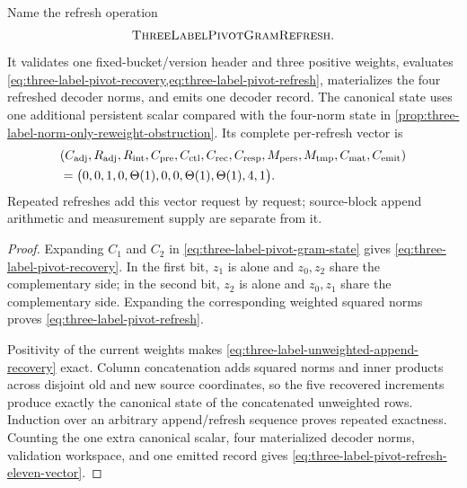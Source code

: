 \begin{theorem}
Name the refresh operation
\begin{equation*}
 \textsc{ThreeLabelPivotGramRefresh}.
\end{equation*}
It validates one fixed-bucket/version header and three positive weights, evaluates
\cref{eq:three-label-pivot-recovery,eq:three-label-pivot-refresh}, materializes
the four refreshed decoder norms, and emits one decoder record.  The canonical
state uses one additional persistent scalar compared with the four-norm state
in \cref{prop:three-label-norm-only-reweight-obstruction}.  Its complete
per-refresh vector is
\begin{equation}
 \begin{aligned}
 &(C_{\rm adj},R_{\rm adj},R_{\rm int},C_{\rm pre},C_{\rm ctl},C_{\rm rec},
 C_{\rm resp},M_{\rm pers},M_{\rm tmp},C_{\rm mat},C_{\rm emit})\\
 &=\bigl(0,0,1,0,\Theta(1),0,0,\Theta(1),\Theta(1),4,1\bigr).
 \end{aligned}
 \label{eq:three-label-pivot-refresh-eleven-vector}
\end{equation}
Repeated refreshes add this vector request by request; source-block append
arithmetic and measurement supply are separate from it.
\end{theorem}

\begin{proof}
Expanding $C_1$ and $C_2$ in
\cref{eq:three-label-pivot-gram-state} gives
\cref{eq:three-label-pivot-recovery}.  In the first bit, $z_1$ is alone and
$z_0,z_2$ share the complementary side; in the second bit, $z_2$ is alone and
$z_0,z_1$ share the complementary side.  Expanding the corresponding weighted
squared norms proves \cref{eq:three-label-pivot-refresh}.

Positivity of the current weights makes
\cref{eq:three-label-unweighted-append-recovery} exact.  Column concatenation
adds squared norms and inner products across disjoint old and new source
coordinates, so the five recovered increments produce exactly the canonical
state of the concatenated unweighted rows.  Induction over an arbitrary
append/refresh sequence proves repeated exactness.  Counting the one extra
canonical scalar, four materialized decoder norms, validation workspace, and
one emitted record gives
\cref{eq:three-label-pivot-refresh-eleven-vector}.
\end{proof}

